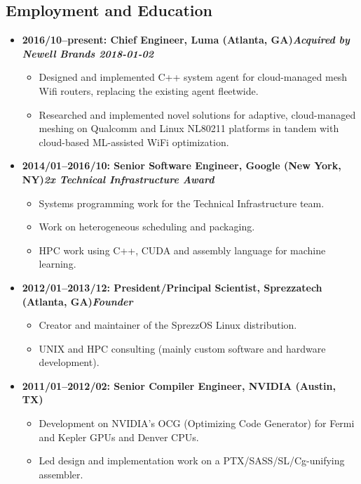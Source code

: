 \documentclass{article}
\newenvironment{tightitemize}
{\begin{itemize}
  \setlength{\itemsep}{1pt}
  \setlength{\parskip}{0pt}
  \setlength{\parsep}{0pt}}
{\end{itemize}}
\begin{document}
\subsection*{Employment and Education}
\begin{tightitemize}

\item \textbf{2016/10--present: Chief Engineer, Luma (Atlanta, GA)\hfill \tiny{\textit{Acquired by Newell Brands 2018-01-02}}}
\begin{tightitemize}
\item Designed and implemented C++ system agent for cloud-managed mesh
	Wifi routers, replacing the existing agent fleetwide.
\item Researched and implemented novel solutions for adaptive, cloud-managed
	meshing on Qualcomm and Linux NL80211 platforms in tandem with
	cloud-based ML-assisted WiFi optimization.
\end{tightitemize}

\item \textbf{2014/01--2016/10: Senior Software Engineer, Google (New York, NY)\hfill \tiny{\textit{2x Technical Infrastructure Award}}}
\begin{tightitemize}
\item Systems programming work for the Technical Infrastructure team.
\item Work on heterogeneous scheduling and packaging.
\item HPC work using C++, CUDA and assembly language for machine learning.
\end{tightitemize}

\item \textbf{2012/01--2013/12: President/Principal Scientist, Sprezzatech (Atlanta, GA)\hfill \tiny{\textit{Founder}}}
\begin{tightitemize}
\item Creator and maintainer of the SprezzOS Linux distribution.
\item UNIX and HPC consulting (mainly custom software and hardware development).
\end{tightitemize}

\item \textbf{2011/01--2012/02: Senior Compiler Engineer, NVIDIA (Austin, TX)}
\begin{tightitemize}
\item Development on NVIDIA's OCG (Optimizing Code Generator) for Fermi and Kepler GPUs and Denver CPUs.
\item Led design and implementation work on a PTX/SASS/SL/Cg-unifying assembler.
\end{tightitemize}


\end{tightitemize}
\end{document}
